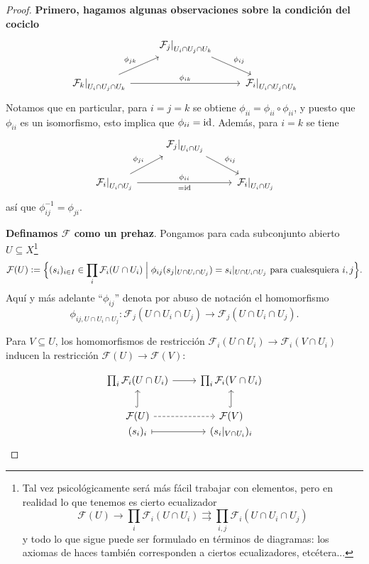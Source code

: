 \documentclass{article}
\numberwithin{equation}{section}
\theoremstyle{definition}
\begin{document}
\begin{proof}
  \textbf{Primero, hagamos algunas observaciones sobre la condición del cociclo}
  \[ \begin{tikzcd}
      & \left.\mathcal{F}_j\right|_{U_i\cap U_j\cap U_k}\ar{dr}{\phi_{ij}} \\
      \left.\mathcal{F}_k\right|_{U_i\cap U_j\cap U_k} \ar{rr}{\phi_{ik}}\ar{ur}{\phi_{jk}} & & \left.\mathcal{F}_i\right|_{U_i\cap U_j\cap U_k}
    \end{tikzcd} \]
  Notamos que en particular, para $i = j = k$ se obtiene
  $\phi_{ii} = \phi_{ii} \circ \phi_{ii}$, y puesto que $\phi_{ii}$
  es un isomorfismo, esto implica que $\phi_{ii} = \mathrm{id}$.
  Además, para $i = k$ se tiene
  \[ \begin{tikzcd}
      & \left.\mathcal{F}_j\right|_{U_i\cap U_j}\ar{dr}{\phi_{ij}} \\
      \left.\mathcal{F}_i\right|_{U_i\cap U_j} \ar{rr}{\phi_{ii}}[swap]{=\idid}\ar{ur}{\phi_{ji}} & & \left.\mathcal{F}_i\right|_{U_i\cap U_j}
    \end{tikzcd} \]
  así que $\phi_{ij}^{-1} = \phi_{ji}$.

  \vspace{1em}

  \textbf{Definamos $\mathcal{F}$ como un prehaz}. Pongamos para cada
  subconjunto abierto $U \subseteq X$\footnote{Tal vez psicológicamente será más
    fácil trabajar con elementos, pero en realidad lo que tenemos es cierto
    ecualizador
    $$\mathcal{F} (U) \to \prod_i \mathcal{F}_i (U \cap U_i) \rightrightarrows \prod_{i,j} \mathcal{F}_i (U \cap U_i \cap U_j)$$
    y todo lo que sigue puede ser formulado en términos de diagramas:
    los axiomas de haces también corresponden a ciertos ecualizadores,
    etcétera...}
  $$\mathcal{F} (U) \mathrel{\mathop:}= \Bigl\{ (s_i)_{i \in I} \in \prod_i \mathcal{F}_i (U \cap U_i) \Bigm| \phi_{ij} (s_j|_{U\cap U_i \cap U_j}) = s_i|_{U\cap U_i \cap U_j} \text{ para cualesquiera }i,j \Bigr\}.$$
  Aquí y más adelante ``$\phi_{ij}$'' denota por abuso de notación el
  homomorfismo
  $$\phi_{ij,U\cap U_i \cap U_j}\colon \mathcal{F}_j (U\cap U_i \cap U_j) \to \mathcal{F}_j (U\cap U_i \cap U_j).$$

  \vspace{1em}

  Para $V \subseteq U$, los homomorfismos de restricción
  $\mathcal{F}_i (U \cap U_i) \to \mathcal{F}_i (V \cap U_i)$ inducen
  la restricción ${\mathcal{F} (U) \to \mathcal{F} (V)}$:

  \[ \begin{tikzcd}
      \prod_i \mathcal{F}_i (U \cap U_i) \ar{r} & \prod_i \mathcal{F}_i (V \cap U_i) \\
      \mathcal{F} (U) \ar[dashed]{r}\ar[hookrightarrow]{u} & \mathcal{F} (V)\ar[hookrightarrow]{u} \\[-2em]
      (s_i)_i \ar[|->]{r} & (s_i|_{V \cap U_i})_i
    \end{tikzcd} \]


\end{proof}
\end{document}
